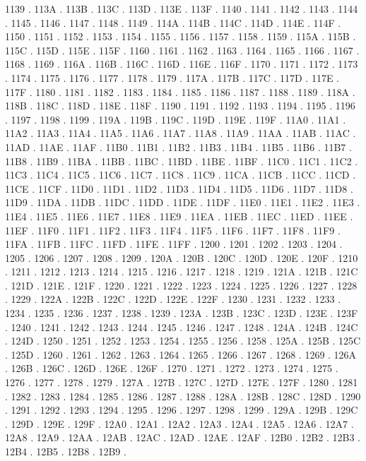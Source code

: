 1139 .
113A .
113B .
113C .
113D .
113E .
113F .
1140 .
1141 .
1142 .
1143 .
1144 .
1145 .
1146 .
1147 .
1148 .
1149 .
114A .
114B .
114C .
114D .
114E .
114F .
1150 .
1151 .
1152 .
1153 .
1154 .
1155 .
1156 .
1157 .
1158 .
1159 .
115A .
115B .
115C .
115D .
115E .
115F .
1160 .
1161 .
1162 .
1163 .
1164 .
1165 .
1166 .
1167 .
1168 .
1169 .
116A .
116B .
116C .
116D .
116E .
116F .
1170 .
1171 .
1172 .
1173 .
1174 .
1175 .
1176 .
1177 .
1178 .
1179 .
117A .
117B .
117C .
117D .
117E .
117F .
1180 .
1181 .
1182 .
1183 .
1184 .
1185 .
1186 .
1187 .
1188 .
1189 .
118A .
118B .
118C .
118D .
118E .
118F .
1190 .
1191 .
1192 .
1193 .
1194 .
1195 .
1196 .
1197 .
1198 .
1199 .
119A .
119B .
119C .
119D .
119E .
119F .
11A0 .
11A1 .
11A2 .
11A3 .
11A4 .
11A5 .
11A6 .
11A7 .
11A8 .
11A9 .
11AA .
11AB .
11AC .
11AD .
11AE .
11AF .
11B0 .
11B1 .
11B2 .
11B3 .
11B4 .
11B5 .
11B6 .
11B7 .
11B8 .
11B9 .
11BA .
11BB .
11BC .
11BD .
11BE .
11BF .
11C0 .
11C1 .
11C2 .
11C3 .
11C4 .
11C5 .
11C6 .
11C7 .
11C8 .
11C9 .
11CA .
11CB .
11CC .
11CD .
11CE .
11CF .
11D0 .
11D1 .
11D2 .
11D3 .
11D4 .
11D5 .
11D6 .
11D7 .
11D8 .
11D9 .
11DA .
11DB .
11DC .
11DD .
11DE .
11DF .
11E0 .
11E1 .
11E2 .
11E3 .
11E4 .
11E5 .
11E6 .
11E7 .
11E8 .
11E9 .
11EA .
11EB .
11EC .
11ED .
11EE .
11EF .
11F0 .
11F1 .
11F2 .
11F3 .
11F4 .
11F5 .
11F6 .
11F7 .
11F8 .
11F9 .
11FA .
11FB .
11FC .
11FD .
11FE .
11FF .
1200 .
1201 .
1202 .
1203 .
1204 .
1205 .
1206 .
1207 .
1208 .
1209 .
120A .
120B .
120C .
120D .
120E .
120F .
1210 .
1211 .
1212 .
1213 .
1214 .
1215 .
1216 .
1217 .
1218 .
1219 .
121A .
121B .
121C .
121D .
121E .
121F .
1220 .
1221 .
1222 .
1223 .
1224 .
1225 .
1226 .
1227 .
1228 .
1229 .
122A .
122B .
122C .
122D .
122E .
122F .
1230 .
1231 .
1232 .
1233 .
1234 .
1235 .
1236 .
1237 .
1238 .
1239 .
123A .
123B .
123C .
123D .
123E .
123F .
1240 .
1241 .
1242 .
1243 .
1244 .
1245 .
1246 .
1247 .
1248 .
124A .
124B .
124C .
124D .
1250 .
1251 .
1252 .
1253 .
1254 .
1255 .
1256 .
1258 .
125A .
125B .
125C .
125D .
1260 .
1261 .
1262 .
1263 .
1264 .
1265 .
1266 .
1267 .
1268 .
1269 .
126A .
126B .
126C .
126D .
126E .
126F .
1270 .
1271 .
1272 .
1273 .
1274 .
1275 .
1276 .
1277 .
1278 .
1279 .
127A .
127B .
127C .
127D .
127E .
127F .
1280 .
1281 .
1282 .
1283 .
1284 .
1285 .
1286 .
1287 .
1288 .
128A .
128B .
128C .
128D .
1290 .
1291 .
1292 .
1293 .
1294 .
1295 .
1296 .
1297 .
1298 .
1299 .
129A .
129B .
129C .
129D .
129E .
129F .
12A0 .
12A1 .
12A2 .
12A3 .
12A4 .
12A5 .
12A6 .
12A7 .
12A8 .
12A9 .
12AA .
12AB .
12AC .
12AD .
12AE .
12AF .
12B0 .
12B2 .
12B3 .
12B4 .
12B5 .
12B8 .
12B9 .
